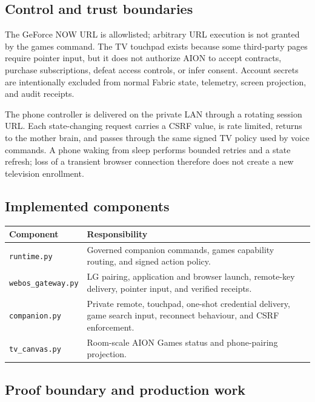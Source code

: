 \documentclass[11pt,a4paper]{article}
\begin{document}
\subsection{Control and trust boundaries}

The GeForce NOW URL is allowlisted; arbitrary URL execution is not granted by
the games command.  The TV touchpad exists because some third-party pages
require pointer input, but it does not authorize AION to accept contracts,
purchase subscriptions, defeat access controls, or infer consent.  Account
secrets are intentionally excluded from normal Fabric state, telemetry,
screen projection, and audit receipts.

The phone controller is delivered on the private LAN through a rotating
session URL.  Each state-changing request carries a CSRF value, is rate
limited, returns to the mother brain, and passes through the same signed TV
policy used by voice commands.  A phone waking from sleep performs bounded
retries and a state refresh; loss of a transient browser connection therefore
does not create a new television enrollment.

\subsection{Implemented components}

\begin{table}[h]
\centering
\small
\begin{tabularx}{\textwidth}{@{}lX@{}}
\toprule
Component & Responsibility\\
\midrule
\texttt{runtime.py} & Governed companion commands, games capability routing,
and signed action policy.\\
\texttt{webos\_gateway.py} & LG pairing, application and browser launch,
remote-key delivery, pointer input, and verified receipts.\\
\texttt{companion.py} & Private remote, touchpad, one-shot credential delivery,
game search input, reconnect behaviour, and CSRF enforcement.\\
\texttt{tv\_canvas.py} & Room-scale AION Games status and phone-pairing
projection.\\
\bottomrule
\end{tabularx}
\end{table}

\subsection{Proof boundary and production work}
\end{document}
